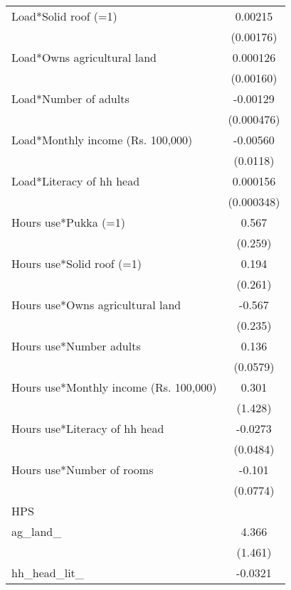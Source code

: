{\begin{tabular}{l*{1}{c}}
\addlinespace
Load*Solid roof (=1)&     0.00215         \\
                    &   (0.00176)         \\
\addlinespace
Load*Owns agricultural land&    0.000126         \\
                    &   (0.00160)         \\
\addlinespace
Load*Number of adults&    -0.00129\sym{***}\\
                    &  (0.000476)         \\
\addlinespace
Load*Monthly income (Rs. 100,000)&    -0.00560         \\
                    &    (0.0118)         \\
\addlinespace
Load*Literacy of hh head&    0.000156         \\
                    &  (0.000348)         \\
\addlinespace
Hours use*Pukka (=1)&       0.567\sym{**} \\
                    &     (0.259)         \\
\addlinespace
Hours use*Solid roof (=1)&       0.194         \\
                    &     (0.261)         \\
\addlinespace
Hours use*Owns agricultural land&      -0.567\sym{**} \\
                    &     (0.235)         \\
\addlinespace
Hours use*Number adults&       0.136\sym{**} \\
                    &    (0.0579)         \\
\addlinespace
Hours use*Monthly income (Rs. 100,000)&       0.301         \\
                    &     (1.428)         \\
\addlinespace
Hours use*Literacy of hh head&     -0.0273         \\
                    &    (0.0484)         \\
\addlinespace
Hours use*Number of rooms&      -0.101         \\
                    &    (0.0774)         \\
\midrule
HPS                 &                     \\
ag\_land\_            &       4.366\sym{***}\\
                    &     (1.461)         \\
\addlinespace
hh\_head\_lit\_        &     -0.0321         \\

\end{tabular}}
